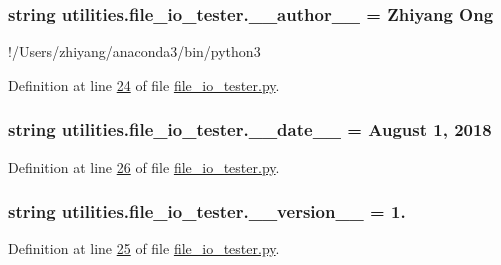 \subsubsection[{\+\_\+\+\_\+author\+\_\+\+\_\+}]{\setlength{\rightskip}{0pt plus 5cm}string utilities.\+file\+\_\+io\+\_\+tester.\+\_\+\+\_\+author\+\_\+\+\_\+ = \textquotesingle{}Zhiyang Ong\textquotesingle{}}\label{namespaceutilities_1_1file__io__tester_a1e98e62ebd56ece4ec2a1b305f33aa72}


!/\+Users/zhiyang/anaconda3/bin/python3 



Definition at line \hyperlink{file__io__tester_8py_source_l00024}{24} of file \hyperlink{file__io__tester_8py_source}{file\+\_\+io\+\_\+tester.\+py}.

\hypertarget{namespaceutilities_1_1file__io__tester_aff68b27f06e5ed552222d5e8ef71af1b}{}
\subsubsection[{\+\_\+\+\_\+date\+\_\+\+\_\+}]{\setlength{\rightskip}{0pt plus 5cm}string utilities.\+file\+\_\+io\+\_\+tester.\+\_\+\+\_\+date\+\_\+\+\_\+ = \textquotesingle{}August 1, 2018\textquotesingle{}}\label{namespaceutilities_1_1file__io__tester_aff68b27f06e5ed552222d5e8ef71af1b}


Definition at line \hyperlink{file__io__tester_8py_source_l00026}{26} of file \hyperlink{file__io__tester_8py_source}{file\+\_\+io\+\_\+tester.\+py}.

\hypertarget{namespaceutilities_1_1file__io__tester_a18133e21b0a493dfcb0dcd31bd81a40e}{}
\subsubsection[{\+\_\+\+\_\+version\+\_\+\+\_\+}]{\setlength{\rightskip}{0pt plus 5cm}string utilities.\+file\+\_\+io\+\_\+tester.\+\_\+\+\_\+version\+\_\+\+\_\+ = \textquotesingle{}1.\textquotesingle{}}\label{namespaceutilities_1_1file__io__tester_a18133e21b0a493dfcb0dcd31bd81a40e}


Definition at line \hyperlink{file__io__tester_8py_source_l00025}{25} of file \hyperlink{file__io__tester_8py_source}{file\+\_\+io\+\_\+tester.\+py}.

